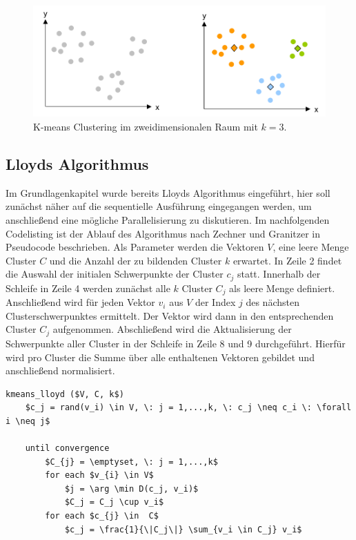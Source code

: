 \begin{figure}
	\centering
	\includegraphics[scale=0.55]{images/kmeans.png}
	\caption{K-means Clustering im zweidimensionalen Raum mit $k = 3$.}
	\label{img:kmeans}
\end{figure}

\subsection{Lloyds Algorithmus}

Im Grundlagenkapitel wurde bereits Lloyds Algorithmus eingeführt, hier soll zunächst näher auf die sequentielle Ausführung eingegangen werden, um anschließend eine mögliche Parallelisierung zu diskutieren. Im nachfolgenden Codelisting ist der Ablauf des Algorithmus nach Zechner und Granitzer \cite{akc2009} in Pseudocode beschrieben. Als Parameter werden die Vektoren $V$, eine leere Menge Cluster $C$ und die Anzahl der zu bildenden Cluster $k$ erwartet. In Zeile 2 findet die Auswahl der initialen Schwerpunkte der Cluster $c_j$ statt. Innerhalb der Schleife in Zeile 4 werden zunächst alle $k$ Cluster $C_j$ als leere Menge definiert. Anschließend wird für jeden Vektor $v_i$ aus $V$ der Index $j$ des nächsten Clusterschwerpunktes ermittelt. Der Vektor wird dann in den entsprechenden Cluster $C_j$ aufgenommen. Abschließend wird die Aktualisierung der Schwerpunkte aller Cluster in der Schleife in Zeile 8 und 9 durchgeführt. Hierfür wird pro Cluster die Summe über alle enthaltenen Vektoren gebildet und anschließend normalisiert.

\lstset{language=C}
\begin{lstlisting}[mathescape=true]
kmeans_lloyd ($V, C, k$)
	$c_j = rand(v_i) \in V, \: j = 1,...,k, \: c_j \neq c_i \: \forall i \neq j$
	
	until convergence
		$C_{j} = \emptyset, \: j = 1,...,k$
		for each $v_{i} \in V$
			$j = \arg \min D(c_j, v_i)$	
			$C_j = C_j \cup v_i$	
		for each $c_{j} \in  C$
			$c_j = \frac{1}{\|C_j\|} \sum_{v_i \in C_j} v_i$
\end{lstlisting}

